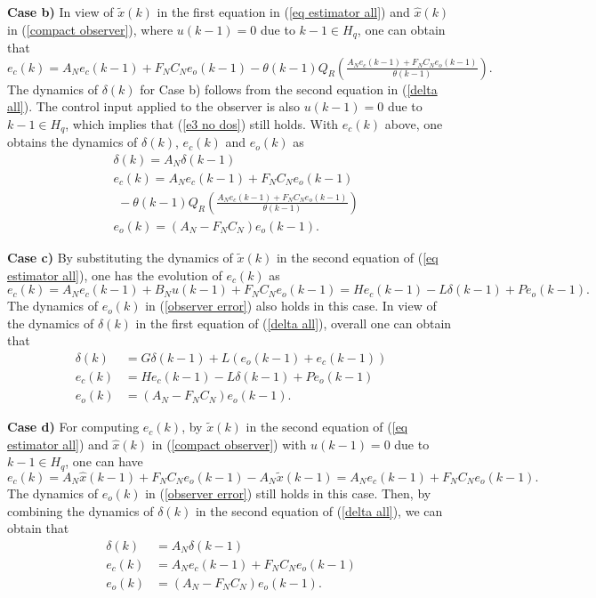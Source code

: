 \documentclass[letterpaper,journal,final,twocolumn]{IEEEtran}
\begin{document}
\textbf{Case b)} In view of $\tilde  x(k)$ in the first equation in (\ref{eq estimator all}) and $\hat x(k)$ in (\ref{compact observer}), where $u(k-1)=0$ due to $k-1\in H_q$, one can obtain that
$
  e_c(k) =  A_N e_c(k-1)  +  F_NC_Ne_o(k-1)  
 - \theta(k-1)Q_R\left(\frac{ A_N e_c(k-1)  +  F_NC_Ne_o(k-1)}{\theta(k-1)} \right ).
$
The dynamics of $\delta(k)$ for Case b) follows from the second equation in (\ref{delta all}). The control input applied to the observer is also $u(k-1)=0$ due to $k-1\in H_q$, which implies that (\ref{e3 no dos}) still holds. With $ e_c(k)$ above, one obtains the dynamics of $\delta(k)$, $e_c(k)$ and $e_o(k)$ as
\begin{subequations}\label{case b}
	\begin{align}
	&\delta(k) = A_N \delta(k-1)  \\
	& e_c(k) =  A_N e_c(k-1)  +  F_NC_Ne_o(k-1) \nonumber\\
	&\,\,- \theta(k-1)Q_R\left(\frac{ A_N e_c(k-1)  + F_NC_Ne_o(k-1)}{\theta(k-1)} \right )\\
	&e_o(k)=(A_N - F_NC_N) e_o(k-1).
	\end{align}
\end{subequations}



\textbf{Case c)} By substituting the dynamics of $\tilde x(k)$ in the second equation of (\ref{eq estimator all}), one has the evolution of $e_c(k)$ as 
$
e_c(k) 
=  A_N e_c(k-1) + B_N u(k-1) + F_NC_Ne_o(k-1) 
=  H e_c(k-1) - L\delta(k-1)+Pe_o(k-1).
$
The dynamics of $e_o(k)$ in (\ref{observer error}) also holds in this case. 
In view of the dynamics of $\delta(k)$ in the first equation of (\ref{delta all}), overall one can obtain that 
\begin{subequations}\label{case c}
	\begin{align}
	\delta(k) &= G \delta(k-1) +L ( e_o(k-1) + e_c(k-1) ) \\
	e_c(k) &= H e_c(k-1) - L\delta(k-1) + Pe_o(k-1) \\
	e_o(k) &=(A_N - F_NC_N)e_o(k-1).
	\end{align}
\end{subequations}



\textbf{Case d)} For computing $e_c(k)$, by $\tilde x(k)$ in the second equation of (\ref{eq estimator all}) and $\hat x(k)$ in (\ref{compact observer}) with $u(k-1)=0$ due to $k-1 \in H_q$, one can have
$
e_c(k) 
=   A_N \hat x(k-1) +F_NC_N e_o(k-1) -A_N \tilde x(k-1) 
=  A_N  e_c(k-1) + F_NC_N e_o(k-1). 
$
The dynamics of $e_o(k)$ in (\ref{observer error}) still holds in this case. 
Then, by combining the dynamics of $\delta(k)$ in the second equation of (\ref{delta all}), we can obtain that
\begin{subequations}\label{case d}
	\begin{align}
	\delta(k) &= A_N  \delta(k-1)  \\
	e_c(k) &=  A_N  e_c(k-1) + F_NC_N e_o(k-1) \\
	 e_o(k) &= (A_N-F_NC_N) e_o(k-1).
	\end{align}
\end{subequations}
\end{document}
